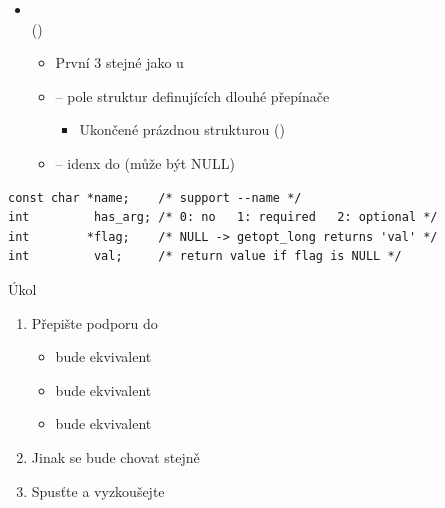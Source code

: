 \begin{frame}[fragile]{}

  \begin{itemize}
    \item {} \\
       ()
    \begin{itemize}
      \item První 3 stejné jako u 
      \item {} -- pole struktur definujících dlouhé přepínače
      \begin{itemize}
	\item Ukončené prázdnou strukturou (\code{\{\}})
      \end{itemize}
      \item {} -- idenx do  (může být NULL)
    \end{itemize}
  \end{itemize}

  \begin{block}{}
  \begin{lstlisting}
const char *name;    /* support --name */
int         has_arg; /* 0: no   1: required   2: optional */
int        *flag;    /* NULL -> getopt_long returns 'val' */
int         val;     /* return value if flag is NULL */
  \end{lstlisting}
  \end{block}

\end{frame}

\begin{frame}{Úkol}

  \begin{enumerate}
    \item Přepište podporu do 
    \begin{itemize}
      \item {} bude ekvivalent 
      \item {} bude ekvivalent 
      \item {} bude ekvivalent 
    \end{itemize}

    \item Jinak se bude chovat stejně
    \item Spusťte a vyzkoušejte
  \end{enumerate}

\end{frame}

